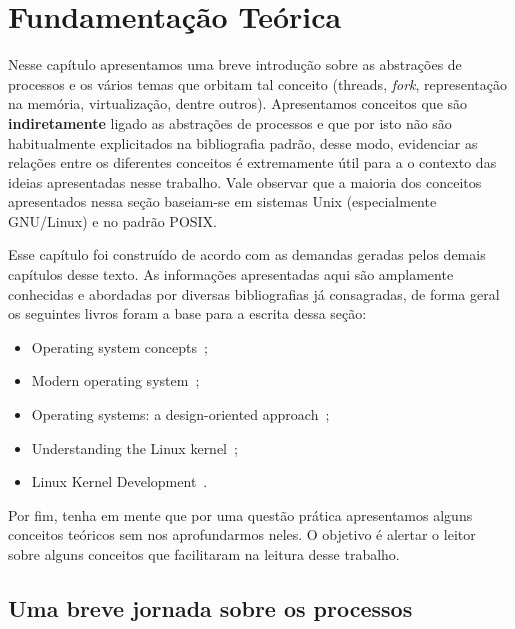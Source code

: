 \chapter{Fundamentação Teórica}
\label{cap:fundamentacao}

Nesse capítulo apresentamos uma breve introdução sobre as abstrações de
processos e os vários temas que orbitam tal conceito (threads, \emph{fork},
representação na memória, virtualização, dentre outros). Apresentamos conceitos
que são \textbf{indiretamente} ligado as abstrações de processos e que por isto
não são habitualmente explicitados na bibliografia padrão, desse modo,
evidenciar as relações entre os diferentes conceitos é extremamente útil para a
o contexto das ideias apresentadas nesse trabalho. Vale observar que a maioria
dos conceitos apresentados nessa seção baseiam-se em sistemas Unix
(especialmente GNU/Linux) e no padrão POSIX.

Esse capítulo foi construído de acordo com as demandas geradas pelos demais
capítulos desse texto. As informações apresentadas aqui são amplamente
conhecidas e abordadas por diversas bibliografias já consagradas, de forma
geral os seguintes livros foram a base para a escrita dessa seção:

\begin{itemize}
  \item Operating system concepts~\citep{silberschatz};
  \item Modern operating system~\citep{tanenbaum};
  \item Operating systems: a design-oriented approach~\citep{crowley};
  \item Understanding the Linux kernel~\citep{entendendo_kernel};
  \item Linux Kernel Development~\citep{love}.
\end{itemize}

Por fim, tenha em mente que por uma questão prática apresentamos alguns
conceitos teóricos sem nos aprofundarmos neles. O objetivo é alertar o leitor
sobre alguns conceitos que facilitaram na leitura desse trabalho.

\label{cap:fundamentacao-teorica}

\section{Uma breve jornada sobre os processos}
\label{sec:processos-e-threads}

